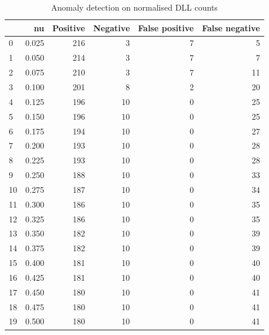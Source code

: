 \documentclass[a4paper,twoside,12pt]{book}
\begin{document}
\begin{appendices}
\begin{table}
	\centering
	\caption{Anomaly detection on normalised DLL counts}
	\label{id:tab:countOCSVM}
	\begin{tabular}{lrrrrr}
		\toprule
		{} &     nu &  Positive &  Negative &  False positive &  False negative \\
		\midrule
		0  &  0.025 &       216 &         3 &               7 &               5 \\
		1  &  0.050 &       214 &         3 &               7 &               7 \\
		2  &  0.075 &       210 &         3 &               7 &              11 \\
		3  &  0.100 &       201 &         8 &               2 &              20 \\
		4  &  0.125 &       196 &        10 &               0 &              25 \\
		5  &  0.150 &       196 &        10 &               0 &              25 \\
		6  &  0.175 &       194 &        10 &               0 &              27 \\
		7  &  0.200 &       193 &        10 &               0 &              28 \\
		8  &  0.225 &       193 &        10 &               0 &              28 \\
		9  &  0.250 &       188 &        10 &               0 &              33 \\
		10 &  0.275 &       187 &        10 &               0 &              34 \\
		11 &  0.300 &       186 &        10 &               0 &              35 \\
		12 &  0.325 &       186 &        10 &               0 &              35 \\
		13 &  0.350 &       182 &        10 &               0 &              39 \\
		14 &  0.375 &       182 &        10 &               0 &              39 \\
		15 &  0.400 &       181 &        10 &               0 &              40 \\
		16 &  0.425 &       181 &        10 &               0 &              40 \\
		17 &  0.450 &       180 &        10 &               0 &              41 \\
		18 &  0.475 &       180 &        10 &               0 &              41 \\
		19 &  0.500 &       180 &        10 &               0 &              41 \\

\end{tabular}
\end{table}
\end{appendices}
\end{document}
